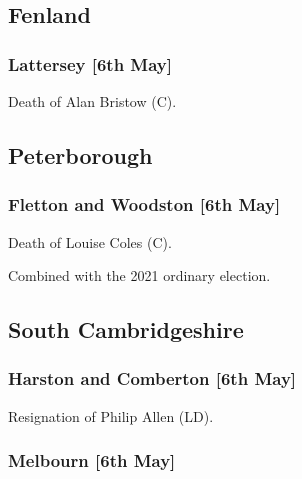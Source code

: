 \documentclass[a4paper,openany]{book}
\begin{document}
\begin{resultsiii}
\subsection*{Fenland}

\subsubsection*{Lattersey \hspace*{\fill}\nolinebreak[1]%
	\enspace\hspace*{\fill}
	[6th May]}


Death of Alan Bristow (C).

\subsection*{Peterborough}

\subsubsection*{Fletton and Woodston \hspace*{\fill}\nolinebreak[1]%
	\enspace\hspace*{\fill}
	[6th May]}


Death of Louise Coles (C).

Combined with the 2021 ordinary election.

\subsection*{South Cambridgeshire}

\subsubsection*{Harston and Comberton \hspace*{\fill}\nolinebreak[1]%
	\enspace\hspace*{\fill}
	[6th May]}


Resignation of Philip Allen (LD).

\subsubsection*{Melbourn \hspace*{\fill}\nolinebreak[1]%
	\enspace\hspace*{\fill}
	[6th May]}


\end{resultsiii}
\end{document}
